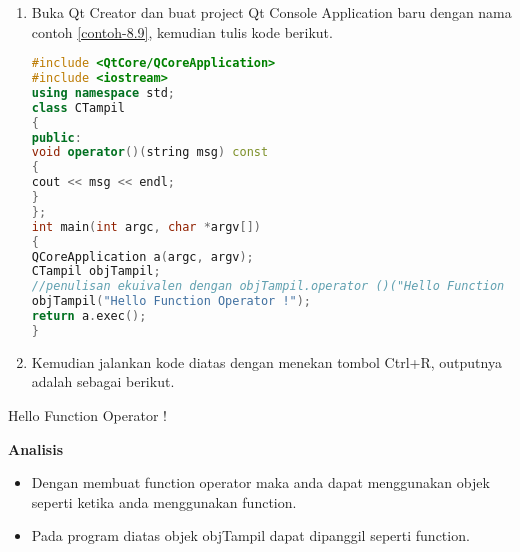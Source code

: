\begin{enumerate}
\def\labelenumi{\arabic{enumi}.}
\item
  Buka Qt Creator dan buat project Qt Console Application baru dengan
  nama contoh \ref{contoh-8.9}, kemudian tulis kode berikut.

\begin{lstlisting}[language=c++, caption=Menggunakan operator() untuk membuat function object., label=contoh-8.9]
#include <QtCore/QCoreApplication>
#include <iostream>
using namespace std;
class CTampil
{
public:
void operator()(string msg) const
{
cout << msg << endl;
}
};
int main(int argc, char *argv[])
{
QCoreApplication a(argc, argv);
CTampil objTampil;
//penulisan ekuivalen dengan objTampil.operator ()("Hello Function Operator !");
objTampil("Hello Function Operator !");
return a.exec();
}
\end{lstlisting}
\item
  Kemudian jalankan kode diatas dengan menekan tombol Ctrl+R, outputnya
  adalah sebagai berikut.
\end{enumerate}

\begin{lcverbatim}
Hello Function Operator !
\end{lcverbatim}

\textbf{Analisis}

\begin{itemize}
\tightlist
\item
  Dengan membuat function operator maka anda dapat menggunakan objek
  seperti ketika anda menggunakan function.
\item
  Pada program diatas objek objTampil dapat dipanggil seperti function.
\end{itemize}
